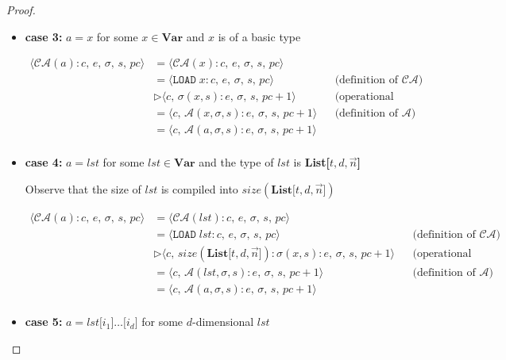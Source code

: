 \documentclass{article}
\begin{document}
\begin{proof}
\begin{itemize}
    \item \textbf{case 3: } $a = x$ for some $x \in \textbf{Var}$ and $x$ is of a basic type

    \[
      \begin{aligned}
        \langle  \mathcal{CA}(a) : c,\, e,\, \sigma,\, s,\, pc \rangle 
        &= \langle \mathcal{CA}(x) : c,\, e,\, \sigma,\, s,\, pc \rangle \\
        &= \langle \texttt{LOAD}\;x : c,\, e,\, \sigma,\, s,\, pc \rangle 
        && \text{(definition of } \mathcal{CA}\text{)} \\
        &\triangleright \langle c,\, \sigma(x, s) : e,\, \sigma,\, s,\, pc+1 \rangle 
        && \text{(operational semantics)} \\
        &= \langle c,\, \mathcal{A}(x, \sigma, s) : e,\, \sigma,\, s,\, pc+1 \rangle 
        && \text{(definition of } \mathcal{A}\text{)} \\
        &= \langle c,\, \mathcal{A}(a, \sigma, s) : e,\, \sigma,\, s,\, pc+1 \rangle \\
      \end{aligned}
  \]

  \item \textbf{case 4: } $a = lst$ for some $lst \in \textbf{Var}$ and the type of $lst$ is \textbf{List[$t, d, \vec{n}$]}

    Observe that the size of $lst$ is compiled into $size(\textbf{List[$t, d, \vec{n}$]})$

  \[
      \begin{aligned}
        \langle  \mathcal{CA}(a) : c,\, e,\, \sigma,\, s,\, pc \rangle 
        &= \langle \mathcal{CA}(lst) : c,\, e,\, \sigma,\, s,\, pc \rangle \\
        &= \langle \texttt{LOAD}\;lst : c,\, e,\, \sigma,\, s,\, pc \rangle 
        && \text{(definition of } \mathcal{CA}\text{)} \\
        &\triangleright \langle c,\, size(\textbf{List[$t, d, \vec{n}$]}) : \sigma(x, s) : e,\, \sigma,\, s,\, pc+1 \rangle 
        && \text{(operational semantics)} \\
        &= \langle c,\, \mathcal{A}(lst, \sigma, s) : e,\, \sigma,\, s,\, pc+1 \rangle 
        && \text{(definition of } \mathcal{A}\text{)} \\
        &= \langle c,\, \mathcal{A}(a, \sigma, s) : e,\, \sigma,\, s,\, pc+1 \rangle \\
      \end{aligned}
  \]

  \item \textbf{case 5: } $a = lst\texttt{[$i_1$]}\dots\texttt{[$i_d$]}$ for some $d$-dimensional $lst$


\end{itemize}
\end{proof}
\end{document}
